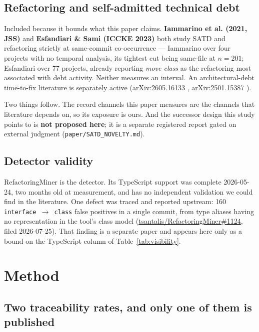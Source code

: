 \documentclass[11pt,a4paper]{article}
\begin{document}
\subsection{Refactoring and self-admitted technical debt}
\label{sec:2.5}

Included because it bounds what this paper claims. \textbf{Iammarino et al. (2021, JSS)} \cite{iammarino2021empirical} and \textbf{Esfandiari \& Sami (ICCKE 2023)} \cite{esfandiari2023exploratory} both study SATD and refactoring strictly at same-commit co-occurrence --- Iammarino over four projects with no temporal analysis, its tightest cut being same-file at $n=201$; Esfandiari over 77 projects, already reporting \emph{move class} as the refactoring most associated with debt activity. Neither measures an interval. An architectural-debt time-to-fix literature is separately active (arXiv:2605.16133 \cite{sutoyo2026dangers}, arXiv:2501.15387 \cite{sutoyo2025tracing}).

Two things follow. The record channels this paper measures are the channels that literature depends on, so its exposure is ours. And the successor design this study points to is \textbf{not proposed here}; it is a separate registered report gated on external judgment (\texttt{paper/\allowbreak{}SATD\_\allowbreak{}NOVELTY.\allowbreak{}md}).

\subsection{Detector validity}
\label{sec:2.6}

RefactoringMiner \cite{tsantalis2026refactoringminer} is the detector. Its TypeScript support was complete 2026-05-24, two months old at measurement, and has no independent validation we could find in the literature. One defect was traced and reported upstream: 160 \texttt{interface $\rightarrow$ class} false positives in a single commit, from type aliases having no representation in the tool's class model (\href{https://github.com/tsantalis/RefactoringMiner/issues/1124}{tsantalis/RefactoringMiner\#1124}, filed 2026-07-25). That finding is a separate paper and appears here only as a bound on the TypeScript column of Table~\ref{tab:visibility}.


\section{Method}
\label{sec:3}

\subsection{Two traceability rates, and only one of them is published}
\label{sec:3.1}
\end{document}
